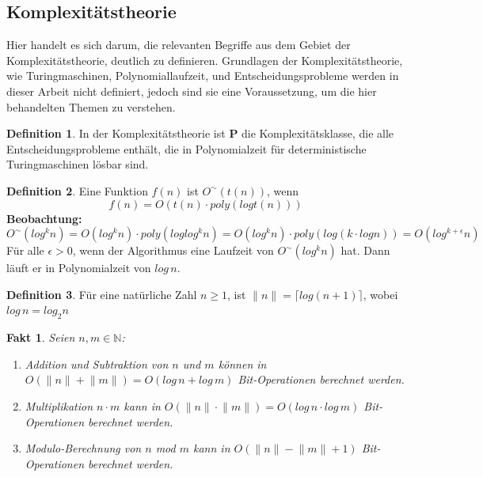 \documentclass[12pt,oneside]{article}
\newtheorem{fact}[theorem]{Fakt}
\theoremstyle{remark}
\theoremstyle{definition}
\newtheorem{definition}{Definition}[section]
\begin{document}
\smallskip

\subsection{Komplexitätstheorie}

Hier handelt es sich darum, die relevanten Begriffe aus dem Gebiet der Komplexitätstheorie, deutlich zu definieren. Grundlagen der Komplexitätstheorie, wie Turingmaschinen, Polynomiallaufzeit, und Entscheidungsprobleme werden in dieser Arbeit nicht definiert, jedoch sind sie eine Voraussetzung, um die hier behandelten Themen zu verstehen.   

\begin{definition}
In der Komplexitätstheorie ist \textbf{P} die Komplexitätsklasse, die alle Entscheidungsprobleme enthält, die in Polynomialzeit für deterministische Turingmaschinen lösbar sind. 
\end{definition}

\begin{definition}
Eine Funktion $f(n)$ ist $ O^{\sim}(t(n))$, wenn
\begin{equation}
    f(n) = O(t(n) \cdot poly(log t(n)))
\end{equation}
\textbf{Beobachtung:}
\begin{equation}
    O^{\sim}(log^k n) = O(log^k n) \cdot poly(log log^k n) = O(log^k n) \cdot poly(log( k \cdot log n)) = O(log^{k+\epsilon}n)
\end{equation}
Für alle $\epsilon > 0$, wenn der Algorithmus eine Laufzeit von $O^{\sim}(log^k n)$ hat. Dann läuft er in Polynomialzeit von $log \, n$.
\end{definition}

\begin{definition}
Für eine natürliche Zahl $n \geq 1$, ist $\lVert n \rVert= \lceil log(n + 1) \rceil$, wobei $log \, n = log_{2} n$
\end{definition}
\begin{fact}\label{fact_1}
Seien $n,m \in \mathbb{N}$:\newline
\begin{enumerate}
    \item Addition und Subtraktion von $n$ und $m$ können in $O(\lVert n \rVert + \lVert m \rVert) = O(log \, n + log \, m)$ Bit-Operationen berechnet werden.\newline
    \item Multiplikation $ n \cdot m$ kann in $O(\lVert n \rVert \cdot \lVert m \rVert) = O(log \, n \cdot log \, m)$ Bit-Operationen berechnet werden.\newline
    \item Modulo-Berechnung von $n$ mod $m$ kann in $O(\lVert n \rVert - \lVert m \rVert + 1)$ Bit-Operationen berechnet werden.\newline\newline
\end{enumerate}
\end{fact}
\end{document}
